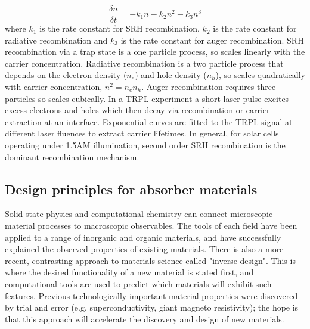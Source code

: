 $$ \frac{\delta n}{\delta t} = -k_1n -k_2n^2 -k_3n^3 $$
where $k_1$ is the rate constant for SRH recombination, $k_2$ is the rate constant for radiative recombination and $k_3$ is the rate constant for auger recombination. SRH recombination via a trap state is a one particle process, so scales linearly with the carrier concentration. Radiative recombination is a two particle process that depends on the electron density ($n_e$) and hole density ($n_h$), so scales quadratically with carrier concentration, $n^2=n_en_h$. Auger recombination requires three particles so scales cubically.
In a TRPL experiment a short laser pulse excites excess electrons and holes which then decay via recombination or carrier extraction at an interface. Exponential curves are fitted to the TRPL signal at different laser fluences to extract carrier lifetimes. In general, for solar cells operating under 1.5AM illumination, second order SRH recombination is the dominant recombination mechanism.
% 


 \subsection{Design principles for absorber materials}
 
Solid state physics and computational chemistry can connect microscopic material processes to macroscopic observables. The tools of each field have been applied to a range of inorganic and organic materials, and have successfully explained the observed properties of existing materials.
There is also a more recent, contrasting approach to materials science called "inverse design". This is where the desired functionality of a new material is stated first, and computational tools are used to predict which materials will exhibit such features.\autocite{Zunger2018}
Previous technologically important material properties were discovered by trial and error (e.g. superconductivity, giant magneto resistivity); the hope is that this approach will accelerate the discovery and design of new materials.

